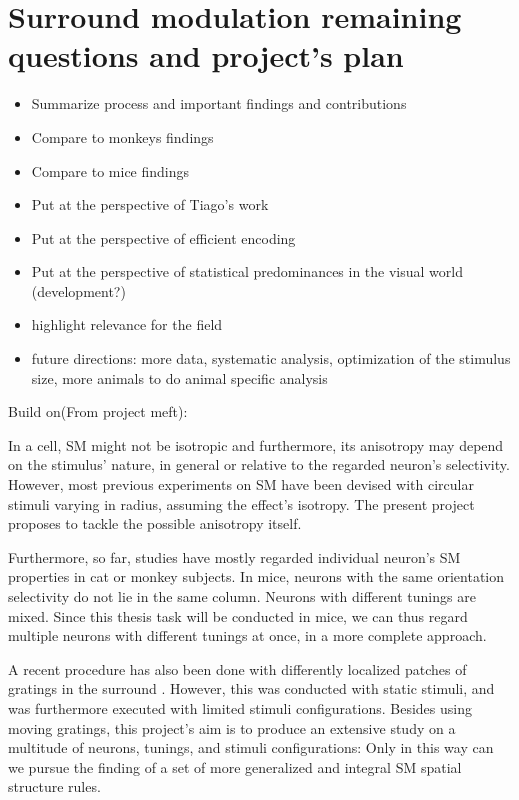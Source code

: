 \label{cap:conclusions}


\section{Surround modulation remaining questions and project's plan} \label{Plan}

\begin{itemize}
\item Summarize process and important findings and contributions
\item Compare to monkeys findings
\item Compare to mice findings
\item Put at the perspective of Tiago's work
\item Put at the perspective of efficient encoding
\item Put at the perspective of statistical predominances in the visual world (development?)
\item highlight relevance for the field
\item future directions: more data, systematic analysis, optimization of the stimulus size, more animals to do animal specific analysis
\end{itemize}


Build on(From project meft):

In a cell, SM might not be isotropic and furthermore, its anisotropy may depend on the stimulus' nature, in general or relative to the regarded neuron's selectivity. However, most previous experiments on SM have been devised with circular stimuli varying in radius, assuming the effect's isotropy. The present project proposes to tackle the possible anisotropy itself.

Furthermore, so far, studies have mostly regarded individual neuron's SM properties in cat or monkey subjects. In mice, neurons with the same orientation selectivity do not lie in the same column. Neurons with different tunings are mixed. Since this thesis task will be conducted in mice, we can thus regard multiple neurons with different tunings at once, in a more complete approach.

A recent procedure has also been done with differently localized patches of gratings in the surround \cite{SManisotropy}. However, this was conducted with static stimuli, and was furthermore executed with limited stimuli configurations. Besides using moving gratings, this project's aim is to produce an extensive study on a multitude of neurons, tunings, and stimuli configurations: Only in this way can we pursue the finding of a set of more generalized and integral SM spatial structure rules.

